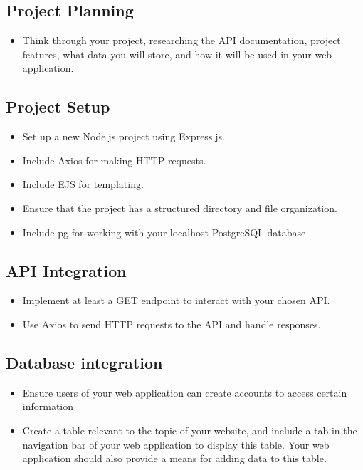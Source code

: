\documentclass{article}
\begin{document}
\subsection{Project Planning}
\begin{itemize}
  \item Think through your project, researching the API documentation, project features, what data you will store, and how it will be used in your web application.
\end{itemize}

\subsection{Project Setup}
\begin{itemize}
  \item Set up a new Node.js project using Express.js.
  \item Include Axios for making HTTP requests.
  \item Include EJS for templating.
  \item Ensure that the project has a structured directory and file organization.
  \item Include pg for working with your localhost PostgreSQL database
\end{itemize}

\subsection{API Integration}
\begin{itemize}
  \item Implement at least a GET endpoint to interact with your chosen API.
  \item Use Axios to send HTTP requests to the API and handle responses.
\end{itemize}

\subsection{Database integration}
\begin{itemize}
  \item Ensure users of your web application can create accounts to access certain information
  \item Create a table relevant to the topic of your website, and include a tab in the navigation bar of 
        your web application to display this table. Your web application should also provide a means for adding data to this table.
\end{itemize}
\end{document}
